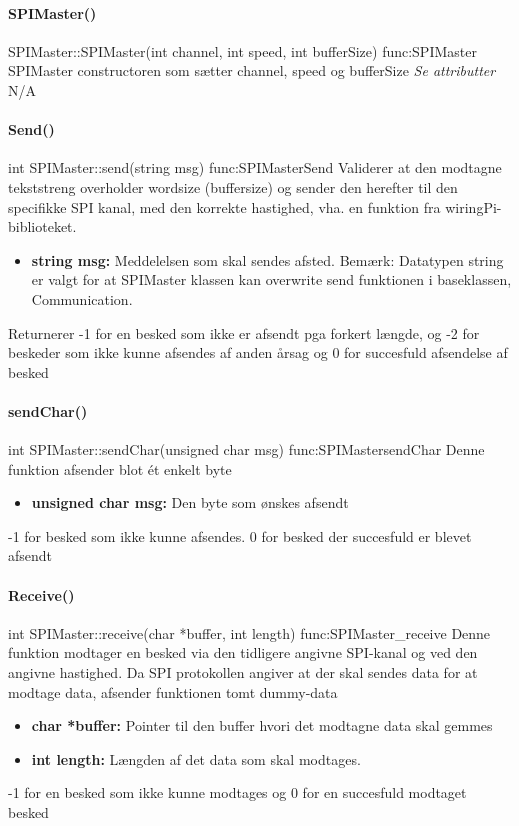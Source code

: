 \paragraph{SPIMaster()}
\begin{functionDescription}
{SPIMaster::SPIMaster(int channel, int speed, int bufferSize)}
{func:SPIMaster}
{SPIMaster constructoren som sætter channel, speed og bufferSize}
{\textit{Se attributter}}
{N/A}
\end{functionDescription}
\paragraph{Send()}
\begin{functionDescription}
{int SPIMaster::send(string msg)}
{func:SPIMasterSend}
{Validerer at den modtagne tekststreng overholder wordsize (buffersize) og sender den herefter til den specifikke SPI kanal, med den korrekte hastighed, vha. en funktion fra wiringPi-biblioteket.}
{\begin{itemize}
    \item \textbf{string msg:} Meddelelsen som skal sendes afsted. Bemærk: Datatypen string er valgt for at SPIMaster klassen kan overwrite send funktionen i baseklassen, Communication.  
\end{itemize}}
{Returnerer -1 for en besked som ikke er afsendt pga forkert længde, og -2 for beskeder som ikke kunne afsendes af anden årsag og 0 for succesfuld afsendelse af besked}
\end{functionDescription}
\paragraph{sendChar()}
\begin{functionDescription}
{int SPIMaster::sendChar(unsigned char msg)}
{func:SPIMastersendChar}
{Denne funktion afsender blot ét enkelt byte}
{\begin{itemize}
    \item \textbf{unsigned char msg:} Den byte som ønskes afsendt
\end{itemize}}
{-1 for besked som ikke kunne afsendes. 0 for besked der succesfuld er blevet afsendt}
\end{functionDescription}
\paragraph{Receive()}
\begin{functionDescription}
{int SPIMaster::receive(char *buffer, int length)}
{func:SPIMaster_receive}
{Denne funktion modtager en besked via den tidligere angivne SPI-kanal og ved den angivne hastighed. Da SPI protokollen angiver at der skal sendes data for at modtage data, afsender funktionen tomt dummy-data}
{\begin{itemize}
    \item \textbf{char *buffer:} Pointer til den buffer hvori det modtagne data skal gemmes
    \item \textbf{int length:} Længden af det data som skal modtages. 
\end{itemize}}
{-1 for en besked som ikke kunne modtages og 0 for en succesfuld modtaget besked}
\end{functionDescription}

